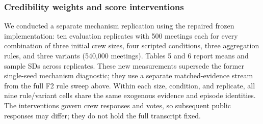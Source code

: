 \documentclass[
  12pt,
]{article}
\begin{document}
\subsubsection{Credibility weights and score
interventions}\label{credibility-weights-and-score-interventions}

We conducted a separate mechanism replication using the repaired frozen
implementation: ten evaluation replicates with 500 meetings each for
every combination of three initial crew sizes, four scripted conditions,
three aggregation rules, and three variants (540,000 meetings). Tables 5
and 6 report means and sample SDs across replicates. These new
measurements supersede the former single-seed mechanism diagnostic; they
use a separate matched-evidence stream from the full F2 rule sweep
above. Within each size, condition, and replicate, all nine rule/variant
cells share the same exogenous evidence and episode identities. The
interventions govern crew responses and votes, so subsequent public
responses may differ; they do not hold the full transcript fixed.

\FloatBarrier
\end{document}
